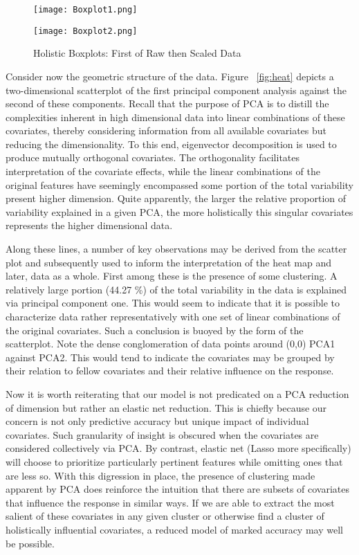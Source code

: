 \documentclass[11pt]{article}
\begin{document}
\begin{figure}[htbp]
\centering
\begin{minipage}{.5\textwidth}
	\centering
	\texttt{[image: Boxplot1.png]}
\end{minipage}%
\begin{minipage}{.5\textwidth}
	\centering
	\texttt{[image: Boxplot2.png]}
\end{minipage}%
\caption{Holistic Boxplots: First of Raw then Scaled Data}\label{fig:box}
\end{figure}
	
	
	Consider now the geometric structure of the data.  Figure ~\ref{fig:heat} depicts a two-dimensional scatterplot of the first principal component analysis against the second of these components.  Recall that the purpose of PCA is to distill the complexities inherent in high dimensional data into linear combinations of these covariates, thereby considering information from all available covariates but reducing the dimensionality.  To this end, eigenvector decomposition is used to produce mutually orthogonal covariates.  The orthogonality facilitates interpretation of the covariate effects, while the linear combinations of the original features have seemingly encompassed some portion of the total variability present higher dimension.  Quite apparently, the larger the relative proportion of variability explained in a given PCA, the more holistically this singular covariates represents the higher dimensional data.  
	
	Along these lines, a number of key observations may be derived from the scatter plot and subsequently used to inform the interpretation of the heat map and later, data as a whole.  First among these is the presence of some clustering.  A relatively large portion (44.27 \%) of the total variability in the data is explained via principal component one.  This would seem to indicate that it is possible to characterize data rather representatively with one set of linear combinations of the original covariates.  Such a conclusion is buoyed by the form of the scatterplot.  Note the dense conglomeration of data points around (0,0) PCA1 against PCA2.  This would tend to indicate the covariates may be grouped by their relation to fellow covariates and their relative influence on the response.  
	
	Now it is worth reiterating that our model is not predicated on a PCA reduction of dimension but rather an elastic net reduction.  This is chiefly because our concern is not only predictive accuracy but unique impact of individual covariates.  Such granularity of insight is obscured when the covariates are considered collectively via PCA.  By contrast, elastic net (Lasso more specifically) will choose to prioritize particularly pertinent features while omitting ones that are less so.  With this digression in place, the presence of clustering made apparent by PCA does reinforce the intuition that there are subsets of covariates that influence the response in similar ways.  If we are able to extract the most salient of these covariates in any given cluster or otherwise find a cluster of holistically influential covariates, a reduced model of marked accuracy may well be possible.  
	
\end{document}
